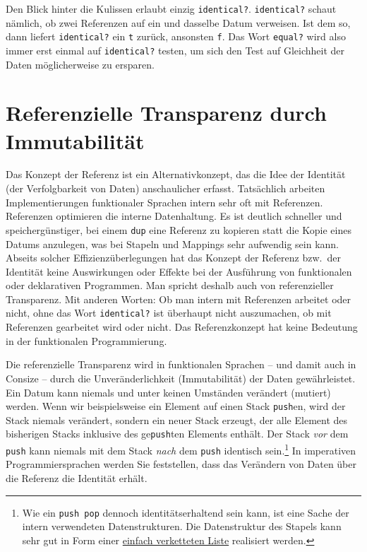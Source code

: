 Den Blick hinter die Kulissen erlaubt einzig \verb|identical?|. \verb|identical?| schaut nämlich, ob zwei Referenzen auf ein und dasselbe Datum verweisen. Ist dem so, dann liefert \verb|identical?| ein \verb|t| zurück, ansonsten \verb|f|. Das Wort \verb|equal?| wird also immer erst einmal auf \verb|identical?| testen, um sich den Test auf Gleichheit der Daten möglicherweise zu ersparen.

\section{Referenzielle Transparenz durch Immutabilität}

Das Konzept der Referenz ist ein Alternativkonzept, das die Idee der Identität (der Verfolgbarkeit von Daten) anschaulicher erfasst. Tatsächlich arbeiten Implementierungen funktionaler Sprachen intern sehr oft mit Referenzen. Referenzen optimieren die interne Datenhaltung. Es ist deutlich schneller und speichergünstiger, bei einem \verb|dup| eine Referenz zu kopieren statt die Kopie eines Datums anzulegen, was bei Stapeln und Mappings sehr aufwendig sein kann. Abseits solcher Effizienzüberlegungen hat das Konzept der Referenz bzw.\ der Identität keine Auswirkungen oder Effekte bei der Ausführung von funktionalen oder deklarativen Programmen. Man spricht deshalb auch von referenzieller Transparenz. Mit anderen Worten: Ob man intern mit Referenzen arbeitet oder nicht, ohne das Wort \verb|identical?| ist überhaupt nicht auszumachen, ob mit Referenzen gearbeitet wird oder nicht. Das Referenzkonzept hat keine Bedeutung in der funktionalen Programmierung.

Die referenzielle Transparenz wird in funktionalen Sprachen -- und damit auch in Consize -- durch die Unveränderlichkeit (Immutabilität) der Daten gewährleistet. Ein Datum kann niemals und unter keinen Umständen verändert (mutiert) werden. Wenn wir beispielsweise ein Element auf einen Stack \verb|push|en, wird der Stack niemals verändert, sondern ein neuer Stack erzeugt, der alle Element des bisherigen Stacks inklusive des ge\verb|push|ten Elements enthält. Der Stack \emph{vor} dem \verb|push| kann niemals mit dem Stack \emph{nach} dem \verb|push| identisch sein.\footnote{Wie ein \texttt{push pop} dennoch identitätserhaltend sein kann, ist eine Sache der intern verwendeten Datenstrukturen. Die Datenstruktur des Stapels kann sehr gut in Form einer \href{http://de.wikipedia.org/wiki/Doppelt_verkettete_Liste\#Einfach_verkettete_Liste}{einfach verketteten Liste} realisiert werden.} In imperativen Programmiersprachen werden Sie feststellen, dass das Verändern von Daten über die Referenz die Identität erhält.

